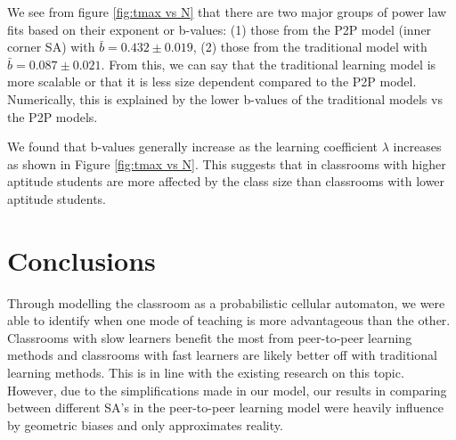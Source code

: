 \documentclass[10pt,a4paper,twoside]{article}
\begin{document}
\noindent We see from figure \ref{fig:tmax vs N} that there are two major groups of power law fits based on their exponent or b-values: (1) those from the P2P model (inner corner SA) with $\bar{b} = 0.432 \pm 0.019$, (2) those from the traditional model with $\bar{b}=0.087\pm0.021$. From this, we can say that the traditional learning model is more scalable or that it is less size dependent compared to the P2P model. Numerically, this is explained by the lower b-values of the traditional models vs the P2P models. 

\noindent We found that b-values generally increase as the learning coefficient $\lambda$ increases as shown in Figure \ref{fig:tmax vs N}. This suggests that in classrooms with higher aptitude students are more affected by the class size than classrooms with lower aptitude students.

\section{Conclusions}
Through modelling the classroom as a probabilistic cellular automaton, we were able to identify when one mode of teaching is more advantageous than the other. Classrooms with slow learners benefit the most from peer-to-peer learning methods and classrooms with fast learners are likely better off with traditional learning methods. This is in line with the existing research on this topic. However, due to the simplifications made in our model, our results in comparing between different SA's in the peer-to-peer learning model were heavily influence by geometric biases and only approximates reality. 




\end{document}
